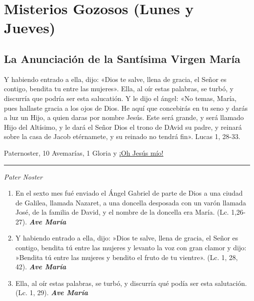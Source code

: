 \documentclass[a4paper,11pt, oneside]{report}
\begin{document}
\section*{Misterios Gozosos (Lunes y Jueves)}\label{sec:gozosos}
{  
  \subsection*{La Anunciación de la Santísima Virgen María}
  {
    
    Y habiendo entrado a ella, dijo: «Dios te salve, llena de gracia, el Señor es contigo, bendita tu entre las mujeres». Ella, al oír estas palabras, se turbó,
    y discurría que podría ser esta salucatión. Y le dijo el ángel: «No temas, María, pues hallaste gracia a los ojos de Dios. He aquí que concebirás en tu seno
    y darás a luz un Hijo, a quien daras por nombre Jesús. Este será grande, y será llamado Hijo del Altísimo, y le dará el Señor Dios el trono de DAvid su padre,
    y reinará sobre la casa de Jacob etérnamete, y su reinado no tendrá fin». Lucas 1, 28-33.
    
     Paternoster, 10 Avemarías, 1 Gloria y \hyperlink{finalAnunciacion}{¡Oh Jesús mío!}
    
    \medskip

    \begin{center}\rule{1\linewidth}{\linethickness}\end{center}

    \medskip

    \textit{Pater Noster}
      
    \begin{enumerate}
      \item En el sexto mes fué enviado el Ángel Gabriel de parte de Dios a una ciudad de Galilea, llamada Nazaret, a una 
      doncella desposada con un varón llamada José, de la familia de David, y el nombre de la doncella era María. (Lc. 1,26- 27). \textbf{\textit{Ave María}}

      \item Y habiendo entrado a ella, dijo: »Dios te salve, llena de gracia, el Señor es contigo, bendita tú entre las mujeres 
      y levanto la voz con gran clamor y dijo: »Bendita tú entre las mujeres y bendito el fruto de tu vientre». (Lc. 1, 28, 42). \textbf{\textit{Ave María}}

      \item Ella, al oír estas palabras, se turbó, y discurría qué podía ser esta salutación. (Lc. 1, 29). \textbf{\textit{Ave María}}


\end{enumerate}}}
\end{document}
